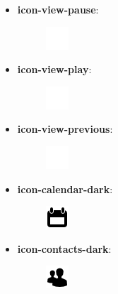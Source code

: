 \documentclass[letterpaper,10pt,english]{sphinxmanual}
\begin{document}
\begin{itemize}
\begin{description}
\end{description}

\item {} \begin{description}
\item[{\textbf{icon-view-pause}:}] \leavevmode
\includegraphics{view-pause.png}

\end{description}

\item {} \begin{description}
\item[{\textbf{icon-view-play}:}] \leavevmode
\includegraphics{view-play.png}

\end{description}

\item {} \begin{description}
\item[{\textbf{icon-view-previous}:}] \leavevmode
\includegraphics{view-previous.png}

\end{description}

\item {} \begin{description}
\item[{\textbf{icon-calendar-dark}:}] \leavevmode
\includegraphics{calendar-dark.png}

\end{description}

\item {} \begin{description}
\item[{\textbf{icon-contacts-dark}:}] \leavevmode
\includegraphics{contacts-dark.png}


\end{description}
\end{itemize}
\end{document}
